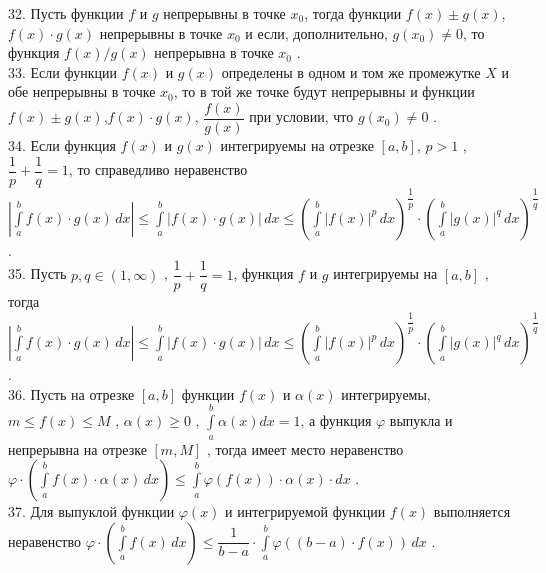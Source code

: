 \documentclass[12pt]{article}
\begin{document}
32. Пусть функции ${\displaystyle f}$ и ${\displaystyle g}$ непрерывны в точке ${\displaystyle x_0}$, тогда функции ${\displaystyle f(x) \pm g(x)}$, ${\displaystyle f(x) \cdot g(x)}$ непрерывны в точке ${\displaystyle x_0}$ и если, дополнительно, ${\displaystyle g(x_0)\neq 0}$, то функция ${\displaystyle f(x)/g(x)}$ непрерывна в точке ${\displaystyle x_0}$ .\\

33. Если функции ${\displaystyle f(x)}$ и ${\displaystyle g(x)}$ определены в одном и том же промежутке ${\displaystyle X}$ и обе непрерывны в точке ${\displaystyle x_0}$, то в той же точке будут непрерывны и функции ${\displaystyle f(x) \pm g(x)}$,${\displaystyle f(x) \cdot g(x)}$, ${\displaystyle \dfrac{f(x)}{g(x)}}$ при условии, что ${\displaystyle g(x_0) \neq 0}$ .\\

34. Если функция ${\displaystyle f(x)}$ и ${\displaystyle g(x)}$ интегрируемы на отрезке ${\displaystyle [a,b]}$, ${\displaystyle p>1}$ , ${\displaystyle \dfrac{1}{p}+\dfrac{1}{q}=1}$, то справедливо неравенство ${\displaystyle |\int \limits _{a}^{b} f(x)\cdot g(x)\, dx| \leq \int \limits _{a}^{b} |f(x)\cdot g(x)| \, dx \leq (\int \limits _{a}^{b} |f(x)|^{p} \, dx)^{\dfrac{1}{p}}\cdot (\int \limits _{a}^{b} |g(x)|^{q} \, dx)^{\dfrac{1}{q}}}$ .\\

35. Пусть ${\displaystyle p,q \in (1,\infty)}$ , ${\displaystyle \dfrac{1}{p}+\dfrac{1}{q}=1}$, функция ${\displaystyle f}$ и ${\displaystyle g}$ интегрируемы на ${\displaystyle [a,b]}$ , тогда ${\displaystyle |\int \limits _{a}^{b} f(x)\cdot g(x)\, dx| \leq \int \limits _{a}^{b} |f(x)\cdot g(x)| \, dx \leq (\int \limits _{a}^{b} |f(x)|^{p} \, dx)^{\dfrac{1}{p}}\cdot (\int \limits _{a}^{b} |g(x)|^{q} \, dx)^{\dfrac{1}{q}}}$ .\\

36. Пусть на отрезке ${\displaystyle [a,b]}$ функции ${\displaystyle f(x)}$ и ${\displaystyle \alpha(x)}$ интегрируемы, ${\displaystyle m \leq f(x) \leq M}$ , ${\alpha(x) \geq 0}$ , ${\displaystyle \int \limits _{a}^{b} \alpha(x) dx=1}$, а функция ${\displaystyle \varphi}$ выпукла и непрерывна на отрезке ${\displaystyle [m,M]}$ , тогда имеет место неравенство ${\displaystyle \varphi \cdot (\int \limits _{a}^{b} f(x)\cdot \alpha(x)\,dx) \leq \int \limits _{a}^{b} \varphi(f(x))\cdot \alpha(x)\cdot dx}$ .\\

37. Для выпуклой функции ${\displaystyle \varphi(x)}$ и интегрируемой функции ${\displaystyle f(x)}$ выполняется неравенство ${\displaystyle \varphi\cdot (\int \limits _{a}^{b} f(x)\,dx) \leq \dfrac{1}{b-a}\cdot \int \limits _{a}^{b} \varphi((b-a)\cdot f(x))\,dx}$ .\\
\end{document}
